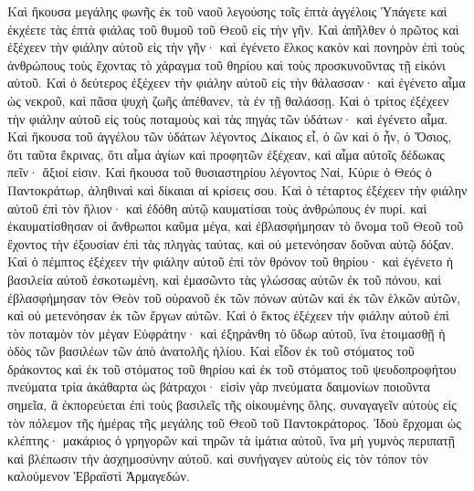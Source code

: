 \begin{pages}
    \begin{Rightside}
        \beginnumbering
		Καὶ ἤκουσα μεγάλης φωνῆς ἐκ τοῦ ναοῦ λεγούσης τοῖς ἑπτὰ ἀγγέλοις Ὑπάγετε καὶ ἐκχέετε τὰς ἑπτὰ φιάλας τοῦ θυμοῦ τοῦ Θεοῦ εἰς τὴν γῆν. Καὶ ἀπῆλθεν ὁ πρῶτος καὶ ἐξέχεεν τὴν φιάλην αὐτοῦ εἰς τὴν γῆν· καὶ ἐγένετο ἕλκος κακὸν καὶ πονηρὸν ἐπὶ τοὺς ἀνθρώπους τοὺς ἔχοντας τὸ χάραγμα τοῦ θηρίου καὶ τοὺς προσκυνοῦντας τῇ εἰκόνι αὐτοῦ. 
		\pend
		\pstart
		Καὶ ὁ δεύτερος ἐξέχεεν τὴν φιάλην αὐτοῦ εἰς τὴν θάλασσαν· καὶ ἐγένετο αἷμα ὡς νεκροῦ, καὶ πᾶσα ψυχὴ ζωῆς ἀπέθανεν, τὰ ἐν τῇ θαλάσσῃ. Καὶ ὁ τρίτος ἐξέχεεν τὴν φιάλην αὐτοῦ εἰς τοὺς ποταμοὺς καὶ τὰς πηγὰς τῶν ὑδάτων· καὶ ἐγένετο αἷμα. Καὶ ἤκουσα τοῦ ἀγγέλου τῶν ὑδάτων λέγοντος Δίκαιος εἶ, ὁ ὢν καὶ ὁ ἦν, ὁ Ὅσιος, ὅτι ταῦτα ἔκρινας, ὅτι αἷμα ἁγίων καὶ προφητῶν ἐξέχεαν, καὶ αἷμα αὐτοῖς δέδωκας πεῖν· ἄξιοί εἰσιν. 
		\pend
		\pstart
		Καὶ ἤκουσα τοῦ θυσιαστηρίου λέγοντος Ναί, Κύριε ὁ Θεός ὁ Παντοκράτωρ, ἀληθιναὶ καὶ δίκαιαι αἱ κρίσεις σου. Καὶ ὁ τέταρτος ἐξέχεεν τὴν φιάλην αὐτοῦ ἐπὶ τὸν ἥλιον· καὶ ἐδόθη αὐτῷ καυματίσαι τοὺς ἀνθρώπους ἐν πυρί. καὶ ἐκαυματίσθησαν οἱ ἄνθρωποι καῦμα μέγα, καὶ ἐβλασφήμησαν τὸ ὄνομα τοῦ Θεοῦ τοῦ ἔχοντος τὴν ἐξουσίαν ἐπὶ τὰς πληγὰς ταύτας, καὶ οὐ μετενόησαν δοῦναι αὐτῷ δόξαν. 
		\pend
		\pstart
		Καὶ ὁ πέμπτος ἐξέχεεν τὴν φιάλην αὐτοῦ ἐπὶ τὸν θρόνον τοῦ θηρίου· καὶ ἐγένετο ἡ βασιλεία αὐτοῦ ἐσκοτωμένη, καὶ ἐμασῶντο τὰς γλώσσας αὐτῶν ἐκ τοῦ πόνου, καὶ ἐβλασφήμησαν τὸν Θεὸν τοῦ οὐρανοῦ ἐκ τῶν πόνων αὐτῶν καὶ ἐκ τῶν ἑλκῶν αὐτῶν, καὶ οὐ μετενόησαν ἐκ τῶν ἔργων αὐτῶν. 
		\pend
		\pstart
		Καὶ ὁ ἕκτος ἐξέχεεν τὴν φιάλην αὐτοῦ ἐπὶ τὸν ποταμὸν τὸν μέγαν Εὐφράτην· καὶ ἐξηράνθη τὸ ὕδωρ αὐτοῦ, ἵνα ἑτοιμασθῇ ἡ ὁδὸς τῶν βασιλέων τῶν ἀπὸ ἀνατολῆς ἡλίου. Καὶ εἶδον ἐκ τοῦ στόματος τοῦ δράκοντος καὶ ἐκ τοῦ στόματος τοῦ θηρίου καὶ ἐκ τοῦ στόματος τοῦ ψευδοπροφήτου πνεύματα τρία ἀκάθαρτα ὡς βάτραχοι· εἰσὶν γὰρ πνεύματα δαιμονίων ποιοῦντα σημεῖα, ἃ ἐκπορεύεται ἐπὶ τοὺς βασιλεῖς τῆς οἰκουμένης ὅλης, συναγαγεῖν αὐτοὺς εἰς τὸν πόλεμον τῆς ἡμέρας τῆς μεγάλης τοῦ Θεοῦ τοῦ Παντοκράτορος. 
		\pend
		\pstart
		Ἰδοὺ ἔρχομαι ὡς κλέπτης· μακάριος ὁ γρηγορῶν καὶ τηρῶν τὰ ἱμάτια αὐτοῦ, ἵνα μὴ γυμνὸς περιπατῇ καὶ βλέπωσιν τὴν ἀσχημοσύνην αὐτοῦ. καὶ συνήγαγεν αὐτοὺς εἰς τὸν τόπον τὸν καλούμενον Ἑβραϊστὶ Ἁρμαγεδών. 

\end{Rightside}
\end{pages}
